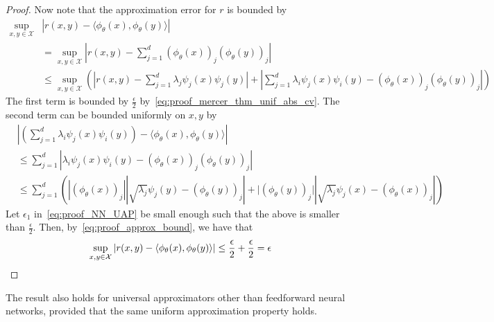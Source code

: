 \begin{proof}
	Now note that the approximation error for \(r\) is bounded by
	\begin{equation}
		\label{eq:proof_approx_bound}
		\begin{split}
			\sup_{x, y \in \mathcal{X}}&{
				\left\lvert r(x,y) - \langle \phi_\theta(x), \phi_\theta(y) \rangle \right\rvert}\\
			&= \sup_{x, y \in \mathcal{X}}{
				\left\lvert r(x,y) - \sum_{j=1}^{d}{(\phi_\theta(x))_j (\phi_\theta(y))_j} \right\rvert} \\
			&\leq \sup_{x,y \in \mathcal{X}}{ \left(
				\left\lvert r(x,y) - \sum_{j=1}^{d}{\lambda_j \psi_j(x) \psi_j(y)} \right\rvert
				+ \left\lvert \sum_{j=1}^{d}{\lambda_i \psi_j(x) \psi_i(y) - (\phi_\theta(x))_j (\phi_\theta(y))_j} \right\rvert  \right) }
		\end{split}
	\end{equation}
	The first term is bounded by \(\frac{\epsilon}{2}\) by~\eqref{eq:proof_mercer_thm_unif_abs_cv}. The second term can be bounded uniformly on \(x,y\) by
	\begin{equation*}
		\begin{split}
			&\left\lvert \left(\sum_{j=1}^{d}{\lambda_i \psi_j(x) \psi_i(y)}\right) - \langle \phi_\theta(x), \phi_\theta(y) \rangle \right\rvert  \\
			&\leq \sum_{j=1}^{d}{ \left\lvert \lambda_i \psi_j(x) \psi_i(y) - (\phi_\theta(x))_j (\phi_\theta(y))_j \right\rvert} \\
			&\leq \sum_{j=1}^{d}{\left(
				\left\lvert (\phi_\theta(x))_j \right\rvert \left\lvert \sqrt{\lambda_j} \psi_j(y) - (\phi_\theta(y))_j \right\rvert
				+ \lvert (\phi_\theta(y))_j \rvert \left\lvert \sqrt{\lambda_j} \psi_j(x) - (\phi_\theta(x))_j \right\rvert
				\right)}
		\end{split}
	\end{equation*}
	Let \(\epsilon_1\) in~\eqref{eq:proof_NN_UAP} be small enough such that the above is smaller than \(\frac{\epsilon}{2}\). Then, by~\eqref{eq:proof_approx_bound}, we have that
	\begin{equation*}
		\sup_{x, y \in \mathcal{X}}{
			\left\lvert r(x,y) - \left \langle \phi_\theta(x), \phi_\theta(y) \right\rangle\right\rvert} \leq \frac{\epsilon}{2} + \frac{\epsilon}{2} = \epsilon
	\end{equation*}
\end{proof}

\begin{remark}
	The result also holds for universal approximators other than feedforward neural networks, provided that the same uniform approximation property holds.
\end{remark}